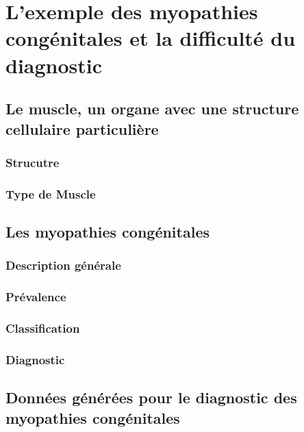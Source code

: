 \chapter{L’exemple des myopathies congénitales et la difficulté du diagnostic}
\section{Le muscle, un organe avec une structure cellulaire particulière}
\subsection{Strucutre}
\subsection{Type de Muscle}
\section{Les myopathies congénitales}
\subsection{Description générale}
\subsection{Prévalence}
\subsection{Classification}
\subsection{Diagnostic}
\section{Données générées pour le diagnostic des myopathies congénitales}